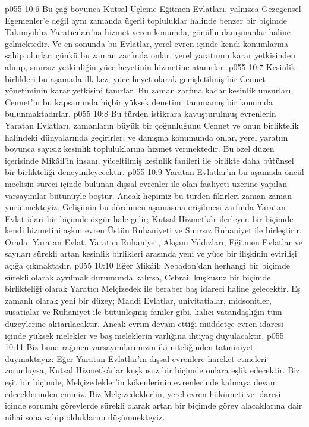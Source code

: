 \vs p055 10:6 Bu çağ boyunca Kutsal Üçleme Eğitmen Evlatları, yalnızca Gezegensel Egemenler’e değil aynı zamanda üçerli topluluklar halinde benzer bir biçimde Takımyıldız Yaratıcıları’na hizmet veren konumda, gönüllü danışmanlar haline gelmektedir. Ve en sonunda bu Evlatlar, yerel evren içinde kendi konumlarına sahip olurlar; çünkü bu zaman zarfında onlar, yerel yaratımın karar yetkisinden alınıp, sınırsız yetkinliğin yüce heyetinin hizmetine atanırlar.
\vs p055 10:7 Kesinlik birlikleri bu aşamada ilk kez, yüce heyet olarak genişletilmiş bir Cennet yönetiminin karar yetkisini tanırlar. Bu zaman zarfına kadar kesinlik unsurları, Cennet’in bu kapsamında hiçbir yüksek denetimi tanımamış bir konumda bulunmaktadırlar.
\vs p055 10:8 Bu türden istikrara kavuşturulmuş evrenlerin Yaratan Evlatları, zamanların büyük bir çoğunluğunu Cennet ve onun birliktelik halindeki dünyalarında geçirirler; ve danışma konumunda onlar, yerel yaratım boyunca sayısız kesinlik topluluklarına hizmet vermektedir. Bu özel düzen içerisinde Mikâil’in insanı, yüceltilmiş kesinlik fanileri ile birlikte daha bütünsel bir birlikteliği deneyimleyecektir.
\vs p055 10:9 Yaratan Evlatlar’ın bu aşamada öncül meclisin süreci içinde bulunan dışsal evrenler ile olan faaliyeti üzerine yapılan varsayımlar bütünüyle boştur. Ancak hepimiz bu türden fikirleri zaman zaman yürütmekteyiz. Gelişimin bu dördüncü aşamasına erişilmesi zarfında Yaratan Evlat idari bir biçimde özgür hale gelir; Kutsal Hizmetkâr ilerleyen bir biçimde kendi hizmetini aşkın evren Üstün Ruhaniyeti ve Sınırsız Ruhaniyet ile birleştirir. Orada; Yaratan Evlat, Yaratıcı Ruhaniyet, Akşam Yıldızları, Eğitmen Evlatlar ve sayıları sürekli artan kesinlik birlikleri arasında yeni ve yüce bir ilişkinin evirilişi açığa çıkmaktadır.
\vs p055 10:10 Eğer Mikâil; Nebadon’dan herhangi bir biçimde sürekli olarak ayrılmak durumunda kalırsa, Cebrail kuşkusuz bir biçimde birlikteliği olarak Yaratıcı Melçizedek ile beraber baş idareci haline gelecektir. Eş zamanlı olarak yeni bir düzey; Maddi Evlatlar, univitatialar, midsonitler, susatialar ve Ruhaniyet\hyp{}ile\hyp{}bütünleşmiş faniler gibi, kalıcı vatandaşlığın tüm düzeylerine aktarılacaktır. Ancak evrim devam ettiği müddetçe evren idaresi içinde yüksek melekler ve baş meleklerin varlığına ihtiyaç duyulacaktır.
\vs p055 10:11 Biz buna rağmen varsayımlarımızın iki niteliğinden tatminiyet duymaktayız: Eğer Yaratan Evlatlar’ın dışsal evrenlere hareket etmeleri zorunluysa, Kutsal Hizmetkârlar kuşkusuz bir biçimde onlara eşlik edecektir. Biz eşit bir biçimde, Melçizedekler’in kökenlerinin evrenlerinde kalmaya devam edeceklerinden eminiz. Biz Melçizedekler’in, yerel evren hükümeti ve idaresi içinde sorumlu görevlerde sürekli olarak artan bir biçimde görev alacaklarına dair nihai sona sahip olduklarını düşünmekteyiz.
